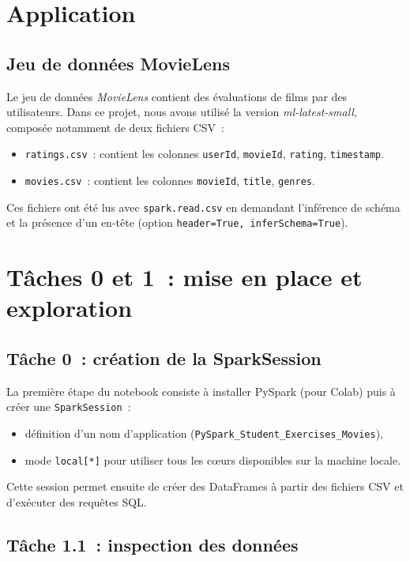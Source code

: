 \documentclass[a4paper,11pt]{article}
\begin{document}
\section{Application}
\subsection{Jeu de données MovieLens}

Le jeu de données \emph{MovieLens} contient des évaluations de films
par des utilisateurs. Dans ce projet, nous avons utilisé la version
\emph{ml-latest-small}, composée notamment de deux fichiers CSV~:
\begin{itemize}
  \item \texttt{ratings.csv}~: contient les colonnes
        \texttt{userId}, \texttt{movieId}, \texttt{rating},
        \texttt{timestamp}.
  \item \texttt{movies.csv}~: contient les colonnes
        \texttt{movieId}, \texttt{title}, \texttt{genres}.
\end{itemize}

Ces fichiers ont été lus avec \texttt{spark.read.csv} en demandant
l'inférence de schéma et la présence d'un en-tête (option
\texttt{header=True, inferSchema=True}).

\section{Tâches 0 et 1~: mise en place et exploration}

\subsection{Tâche 0~: création de la SparkSession}

La première étape du notebook consiste à installer PySpark
(pour Colab) puis à créer une \texttt{SparkSession}~:
\begin{itemize}
  \item définition d'un nom d'application
        (\texttt{PySpark\_Student\_Exercises\_Movies}),
  \item mode \texttt{local[*]} pour utiliser tous les cœurs
        disponibles sur la machine locale.
\end{itemize}

Cette session permet ensuite de créer des DataFrames à partir
des fichiers CSV et d'exécuter des requêtes SQL.

\subsection{Tâche 1.1~: inspection des données}
\end{document}
